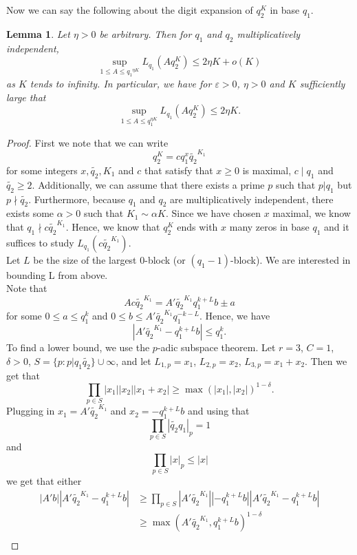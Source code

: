 \documentclass[12pt]{amsart}
\renewcommand{\leq}{\leqslant}
\renewcommand{\geq}{\geqslant}
\newtheorem{lemma}[theorem]{Lemma}
\theoremstyle{definition}
\numberwithin{equation}{section}
\numberwithin{equation}{section}
\begin{document}
Now we can say the following about the digit expansion of $q_2^K$ in base $q_1$.
\begin{lemma}\label{no-long-subsequences}
    Let $\eta>0$ be arbitrary. Then for $q_1$ and $q_2$ multiplicatively independent,
    \[
        \sup\limits_{1\leq A \leq {q_1}^{\eta K}} L_{q_1}(Aq_2^K)\leq 2\eta K + o(K)
    \]
    as $K$ tends to infinity. In particular, we have for $\varepsilon>0$, $\eta >0$ and $K$ sufficiently large that
        \[
            \sup\limits_{1\leq A \leq q_1^{\eta K}} L_{q_1}(Aq_2^K) \leq 2\eta K.
        \]
\end{lemma}
\begin{proof}
	First we note that we can write 
    \[
    q_2^K=cq_1^x\tilde{q_{2}}^{K_1}
    \]
    for some integers $x,\tilde{q_{2}},K_1$ and $c$ that satisfy that $x\geq 0$ is maximal, $c\mid q_1$ and $\tilde{q_{2}}\geq 2$. Additionally, we can assume that there exists a prime $p$ such that $p| q_1$ but $p\nmid \tilde{q_{2}}$. Furthermore, because $q_1$ and $q_2$ are multiplicatively independent, there exists some $\alpha>0$ such that $K_1\sim \alpha K$. Since we have chosen $x$ maximal, we know that $q_1\nmid c\tilde{q_{2}}^{K_1}$. Hence, we know that $q_2^K$ ends with $x$ many zeros in base $q_1$ and it suffices to study $L_{q_1}\left(c\tilde{q_{2}}^{K_1}\right)$.\\
	Let $L$ be the size of the largest $0$-block (or $(\mathrel{{q_1}{-}{1}})$-block). We are interested in bounding L from above.\\
	Note that
	\[
		Ac\tilde{q_{2}}^{K_1}=A'\tilde{q_{2}}^{K_1}q_1^{k+L}b\pm a
	\]
	for some $0\leq a \leq q_1^k$ and $0\leq b \leq A'\tilde{q_{2}}^{K_1}q_1^{-k-L}$. Hence, we have
	\[
		\left|A'\tilde{q_{2}}^{K_1}-q_1^{k+L}b\right|\leq q_1^k.
	\]
	To find a lower bound, we use the $p$-adic subspace theorem. Let $r=3$, $C=1$, $\delta>0$, $S=\{p:p|q_1\tilde{q_{2}}\}\cup \infty$, and let $L_{1,p} = x_1$, $L_{2,p}=x_2$, $L_{3,p}=x_1+x_2$. Then we get that
	\[
		\prod_{p\in S}\left|x_1\right|\left|x_2\right|\left| x_1+x_2 \right|\geq \max(|x_1|,|x_2|)^{1-\delta}.
	\]
	Plugging in $x_1=A'\tilde{q_{2}}^{K_1}$ and $x_2=-q_1^{k+L}b$ and using that
	\[
		\prod_{p\in S}|\tilde{q_{2}}q_1|_p=1
	\]
	and
	\[
		\prod_{p\in S}|x|_p \leq |x|
	\]
	we get that either
	\begin{align*}
	    |A'b|\left|A'\tilde{q_{2}}^{K_1}-q_1^{k+L}b\right|&\geq \prod_{p\in S}\left|A'\tilde{q_{2}}^{K_1}\right|\left|-q_1^{k+L}b\right|\left| A'\tilde{q_{2}}^{K_1}-q_1^{k+L}b \right|\\
        &\geq \max(A'\tilde{q_{2}}^{K_1},q_1^{k+L}b)^{1-\delta}\\

\end{align*}
\end{proof}
\end{document}
